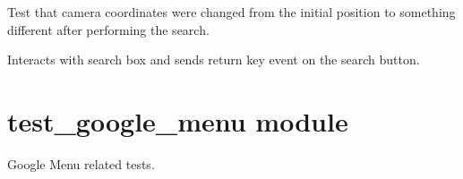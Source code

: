 \documentclass[letterpaper,10pt,english]{sphinxmanual}
\begin{document}
\begin{fulllineitems}
\begin{fulllineitems}
\end{fulllineitems}


\begin{fulllineitems}
\label{test_general:test_general.TestSearch.test_search_hitting_return_on_search_button}
Test that camera coordinates were changed from the initial
position to something different after performing the search.

Interacts with search box and sends return key event on the
search button.

\end{fulllineitems}


\end{fulllineitems}



\section{test\_google\_menu module}
\label{test_google_menu:test-google-menu-module}\label{test_google_menu::doc}\label{test_google_menu:module-test_google_menu}
Google Menu related tests.
\end{document}
